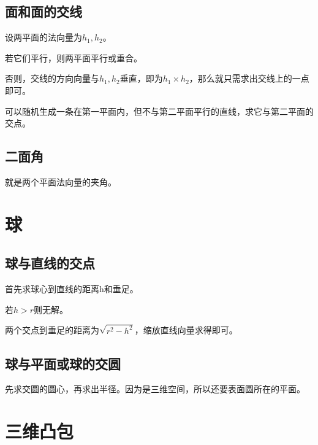 \subsection{面和面的交线}
\begin{frame}
设两平面的法向量为$h_1,h_2$。

若它们平行，则两平面平行或重合。

否则，交线的方向向量与$h_1,h_2$垂直，即为$h_1 \times h_2$，那么就只需求出交线上的一点即可。

可以随机生成一条在第一平面内，但不与第二平面平行的直线，求它与第二平面的交点。
\end{frame}

\subsection{二面角}
\begin{frame}
\pause
就是两个平面法向量的夹角。
\end{frame}

\section{球}
\subsection{球与直线的交点}
\begin{frame}
\pause
首先求球心到直线的距离h和垂足。

\pause
若$h>r$则无解。

\pause
两个交点到垂足的距离为$\sqrt{r^2-h^2}$，缩放直线向量求得即可。
\end{frame}

\subsection{球与平面或球的交圆}
\begin{frame}
\pause
先求交圆的圆心，再求出半径。因为是三维空间，所以还要表面圆所在的平面。
\end{frame}

\section{三维凸包}

